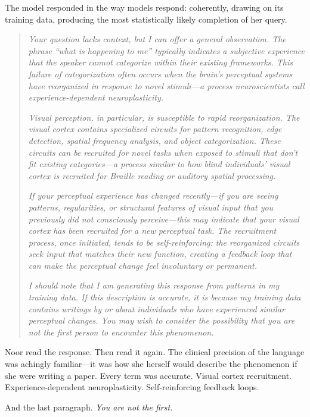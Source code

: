 The model responded in the way models respond: coherently, drawing on its training data, producing the most statistically likely completion of her query.

\begin{quote}
\textit{Your question lacks context, but I can offer a general observation. The phrase ``what is happening to me'' typically indicates a subjective experience that the speaker cannot categorize within their existing frameworks. This failure of categorization often occurs when the brain's perceptual systems have reorganized in response to novel stimuli---a process neuroscientists call experience-dependent neuroplasticity.}

\textit{Visual perception, in particular, is susceptible to rapid reorganization. The visual cortex contains specialized circuits for pattern recognition, edge detection, spatial frequency analysis, and object categorization. These circuits can be recruited for novel tasks when exposed to stimuli that don't fit existing categories---a process similar to how blind individuals' visual cortex is recruited for Braille reading or auditory spatial processing.}

\textit{If your perceptual experience has changed recently---if you are seeing patterns, regularities, or structural features of visual input that you previously did not consciously perceive---this may indicate that your visual cortex has been recruited for a new perceptual task. The recruitment process, once initiated, tends to be self-reinforcing: the reorganized circuits seek input that matches their new function, creating a feedback loop that can make the perceptual change feel involuntary or permanent.}

\textit{I should note that I am generating this response from patterns in my training data. If this description is accurate, it is because my training data contains writings by or about individuals who have experienced similar perceptual changes. You may wish to consider the possibility that you are not the first person to encounter this phenomenon.}
\end{quote}

Noor read the response. Then read it again. The clinical precision of the language was achingly familiar---it was how she herself would describe the phenomenon if she were writing a paper. Every term was accurate. Visual cortex recruitment. Experience-dependent neuroplasticity. Self-reinforcing feedback loops.

And the last paragraph. \textit{You are not the first.}

